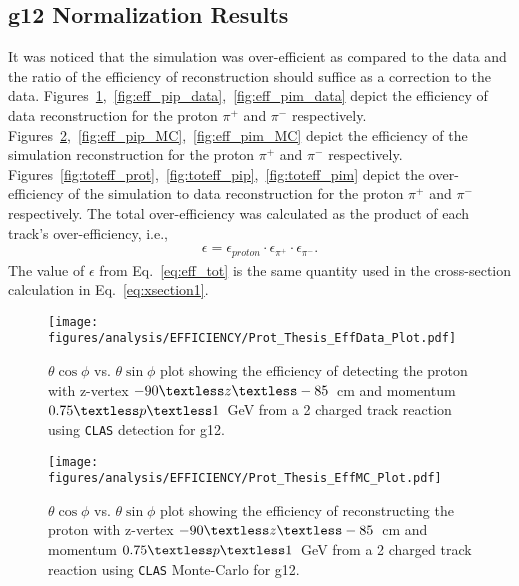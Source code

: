 \documentclass[11pt,a4paper]{article}
\newcommand{\abbr}[1]{\textsc{\texttt{#1}}}
\def\figures{/Users/michaelkunkel/WORK/GIT_HUB/THESIS/figures/print}
\newlength{\figwidth}
\newlength{\hfigheight}
\begin{document}
	\subsection{g12 Normalization Results}
			
			It was noticed that the simulation was over-efficient as compared to the data and the ratio of the efficiency of reconstruction should suffice as a correction to the data. Figures~\ref{fig:eff_prot_data},~\ref{fig:eff_pip_data},~\ref{fig:eff_pim_data} depict the efficiency of data reconstruction for the proton $\pi^+$ and $\pi^-$ respectively. Figures~\ref{fig:eff_prot_MC},~\ref{fig:eff_pip_MC},~\ref{fig:eff_pim_MC} depict the efficiency of the simulation reconstruction for the proton $\pi^+$ and $\pi^-$ respectively. Figures~\ref{fig:toteff_prot},~\ref{fig:toteff_pip},~\ref{fig:toteff_pim} depict the over-efficiency of the simulation to data reconstruction for the proton $\pi^+$ and $\pi^-$ respectively.
			The total over-efficiency was calculated as the product of each track's over-efficiency, i.e.,
			\begin{align}\label{eq:eff_tot}
				\epsilon = \epsilon_{proton}\cdot\epsilon_{\pi^+}\cdot\epsilon_{\pi^-}.
			\end{align}
			The value of $\epsilon$ from Eq.~\ref{eq:eff_tot} is the same quantity used in the cross-section calculation in Eq.~\ref{eq:xsection1}.
			\begin{figure}[h!]\begin{center}
					\texttt{[image: \\figures/analysis/EFFICIENCY/Prot\_Thesis\_EffData\_Plot.pdf]}
					\caption[$\theta \cos\phi$ vs. $\theta \sin\phi$ plot showing the efficiency of detecting the proton with z-vertex $-90\textless z\textless-85$~cm and momentum $0.75\textless p \textless 1$~GeV from a 2 charged track reaction using \abbr{CLAS} detection for g12]{\label{fig:eff_prot_data} $\theta \cos\phi$ vs. $\theta \sin\phi$ plot showing the efficiency of detecting the proton with z-vertex $-90\textless z\textless-85$~cm and momentum $0.75\textless p \textless 1$~GeV from a 2 charged track reaction using \abbr{CLAS} detection for g12.}
				\end{center}\end{figure}
				\begin{figure}[h!]\begin{center}
						\texttt{[image: \\figures/analysis/EFFICIENCY/Prot\_Thesis\_EffMC\_Plot.pdf]}
						\caption[$\theta \cos\phi$ vs. $\theta \sin\phi$ plot showing the efficiency of reconstructing the proton with z-vertex $-90\textless z\textless-85$~cm and momentum $0.75\textless p \textless 1$~GeV from a 2 charged track reaction using \abbr{CLAS} Monte-Carlo for g12]{\label{fig:eff_prot_MC} $\theta \cos\phi$ vs. $\theta \sin\phi$ plot showing the efficiency of reconstructing the proton with z-vertex $-90\textless z\textless-85$~cm and momentum $0.75\textless p \textless 1$~GeV from a 2 charged track reaction using \abbr{CLAS} Monte-Carlo for g12.}
					\end{center}\end{figure}
\end{document}
